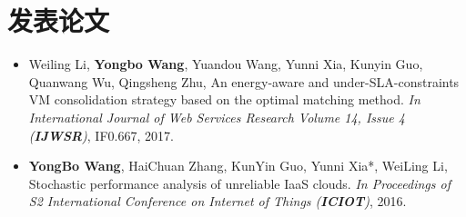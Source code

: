 \documentclass{resume}
\begin{document}
\section{发表论文}
\begin{itemize}[parsep=0.2ex]
  \item Weiling Li, \textbf{Yongbo Wang}, Yuandou Wang, Yunni Xia, Kunyin Guo, Quanwang Wu, Qingsheng Zhu, An energy-aware and under-SLA-constraints VM consolidation strategy based on the optimal matching method. \textit{In International Journal of Web Services Research Volume 14, Issue 4 (\textbf{IJWSR})}, IF0.667, 2017.
  \item \textbf{YongBo Wang}, HaiChuan Zhang, KunYin Guo, Yunni Xia*, WeiLing Li, Stochastic performance analysis of unreliable IaaS clouds. \textit{In Proceedings of S2 International Conference on Internet of Things (\textbf{ICIOT})}, 2016.
\end{itemize}
\end{document}

